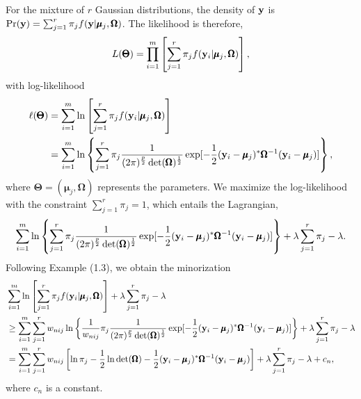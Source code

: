 \documentclass{scrartcl}
\begin{document}
For the mixture of $r$ Gaussian distributions, the density of $\mathbf{y}$ is $\Pr(\mathbf{y}) = \sum_{j=1}^r \pi_j f(\mathbf{y}|\pmb{\mu}_j, \pmb{\Omega})$.
The likelihood is therefore,
\begin{equation}
L(\pmb{\Theta}) = 
\prod_{i=1}^m \left[  \sum_{j=1}^r \pi_j f(\mathbf{y}_i|\pmb{\mu}_j, \pmb{\Omega}) \right],
\end{equation}
with log-likelihood
\begin{equation}
\begin{split}
\ell (\pmb{\Theta}) & =
\sum_{i=1}^m \ln \left[  \sum_{j=1}^r \pi_j f(\mathbf{y}_i|\pmb{\mu}_j, \pmb{\Omega}) \right] \\
& = \sum_{i=1}^m \ln
\left\lbrace
\sum_{j=1}^r \pi_j {1 \over ({2\pi})^{p \over 2} \det(\pmb{\Omega})^{1 \over 2}} \exp[-{1\over 2}(\mathbf{y}_i-\pmb{\mu}_j)^*\pmb{\Omega}^{-1}(\mathbf{y}_i-\pmb{\mu}_j)]
\right\rbrace,
\end{split}
\end{equation}
where $\pmb{\Theta} = (\pmb{\mu}_j, \pmb{\Omega})$ represents the parameters.
We maximize the log-likelihood with the constraint $\sum_{j=1}^r \pi_j = 1$, which entails the Lagrangian,
\begin{equation}
\sum_{i=1}^m \ln
\left\lbrace
\sum_{j=1}^r \pi_j {1 \over ({2\pi})^{p \over 2} \det(\pmb{\Omega})^{1 \over 2}} \exp[-{1\over 2}(\mathbf{y}_i-\pmb{\mu}_j)^*\pmb{\Omega}^{-1}(\mathbf{y}_i-\pmb{\mu}_j)]
\right\rbrace + \lambda \sum_{j=1}^r \pi_j - \lambda.
\end{equation}
Following Example (1.3), we obtain the minorization
\begin{equation}
\begin{split}
& \sum_{i=1}^m \ln \left[  \sum_{j=1}^r \pi_j f(\mathbf{y}_i|\pmb{\mu}_j, \pmb{\Omega}) \right] + \lambda \sum_{j=1}^r \pi_j - \lambda \\ 
& \ge \sum_{i=1}^m
    \sum_{j=1}^r
        { w_{nij} }
        \ln \left\lbrace
            { 1 \over w_{nij}}
            \pi_j {1 \over ({2\pi})^{p \over 2} \det(\pmb{\Omega})^{1 \over 2}} \exp[-{1\over 2}(\mathbf{y}_i-\pmb{\mu}_j)^*\pmb{\Omega}^{-1}(\mathbf{y}_i-\pmb{\mu}_j)]
        \right\rbrace + \lambda \sum_{j=1}^r \pi_j - \lambda \\
& = \sum_{i=1}^m \sum_{j=1}^r { w_{nij} }
    \left[ \ln \pi_j - {1 \over 2} \ln \det(\pmb{\Omega}) -{1\over 2}(\mathbf{y}_i-\pmb{\mu}_j)^*\pmb{\Omega}^{-1}(\mathbf{y}_i-\pmb{\mu}_j) \right] 
    + \lambda \sum_{j=1}^r \pi_j - \lambda + c_n,
\end{split}
\label{eqn:p614_obj}
\end{equation}
where $c_n$ is a constant.
\end{document}
